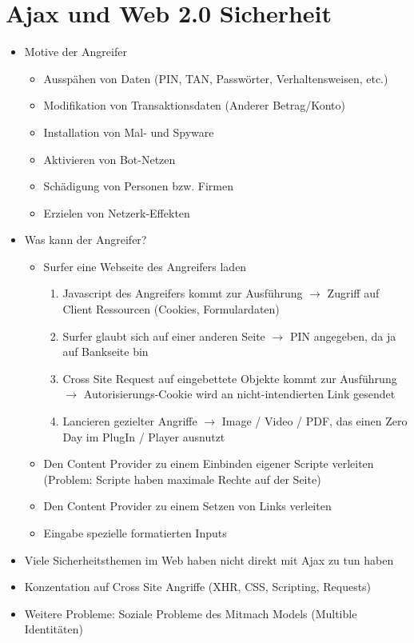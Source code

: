 \documentclass{article} %
\begin{document}
	\section{Ajax und Web 2.0 Sicherheit}
	\begin{itemize}
		\item Motive der Angreifer
		\begin{itemize}
			\item Ausspähen von Daten (PIN, TAN, Passwörter, Verhaltensweisen, etc.)
			\item Modifikation von Transaktionsdaten (Anderer Betrag/Konto)
			\item Installation von Mal- und Spyware
			\item Aktivieren von Bot-Netzen
			\item Schädigung von Personen bzw. Firmen
			\item Erzielen von Netzerk-Effekten
		\end{itemize}
		\item Was kann der Angreifer?
		\begin{itemize}
			\item Surfer eine Webseite des Angreifers laden
			\begin{enumerate}
				\item Javascript des Angreifers kommt zur Ausführung $\rightarrow$ Zugriff auf Client Ressourcen (Cookies, Formulardaten)
				\item Surfer glaubt sich auf einer anderen Seite $\rightarrow$ PIN angegeben, da ja auf Bankseite bin
				\item Cross Site Request auf eingebettete Objekte kommt zur Ausführung $\rightarrow$ Autorisierungs-Cookie wird an nicht-intendierten Link gesendet
				\item Lancieren gezielter Angriffe $\rightarrow$ Image / Video / PDF, das einen Zero Day im PlugIn / Player ausnutzt
			\end{enumerate}
			\item Den Content Provider zu einem Einbinden eigener Scripte verleiten (Problem: Scripte haben maximale Rechte auf der Seite)
			\item Den Content Provider zu einem Setzen von Links verleiten 
			\item Eingabe spezielle formatierten Inputs 
		\end{itemize}
		\item Viele Sicherheitsthemen im Web haben nicht direkt mit Ajax zu tun haben
		\item Konzentation auf Cross Site Angriffe (XHR, CSS, Scripting, Requests)
		\item Weitere Probleme: Soziale Probleme des Mitmach Models (Multible Identitäten)
	\end{itemize}
	
\end{document}
